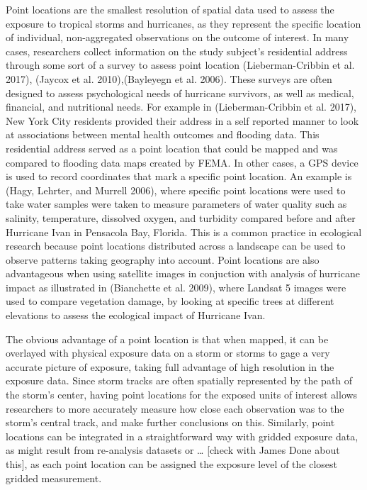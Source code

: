 \documentclass[]{article}
\begin{document}
Point locations are the smallest resolution of spatial data used to
assess the exposure to tropical storms and hurricanes, as they represent
the specific location of individual, non-aggregated observations on the
outcome of interest. In many cases, researchers collect information on
the study subject's residential address through some sort of a survey to
assess point location (Lieberman-Cribbin et al. 2017), (Jaycox et al.
2010),(Bayleyegn et al. 2006). These surveys are often designed to
assess psychological needs of hurricane survivors, as well as medical,
financial, and nutritional needs. For example in (Lieberman-Cribbin et
al. 2017), New York City residents provided their address in a self
reported manner to look at associations between mental health outcomes
and flooding data. This residential address served as a point location
that could be mapped and was compared to flooding data maps created by
FEMA. In other cases, a GPS device is used to record coordinates that
mark a specific point location. An example is (Hagy, Lehrter, and
Murrell 2006), where specific point locations were used to take water
samples were taken to measure parameters of water quality such as
salinity, temperature, dissolved oxygen, and turbidity compared before
and after Hurricane Ivan in Pensacola Bay, Florida. This is a common
practice in ecological research because point locations distributed
across a landscape can be used to observe patterns taking geography into
account. Point locations are also advantageous when using satellite
images in conjuction with analysis of hurricane impact as illustrated in
(Bianchette et al. 2009), where Landsat 5 images were used to compare
vegetation damage, by looking at specific trees at different elevations
to assess the ecological impact of Hurricane Ivan.

The obvious advantage of a point location is that when mapped, it can be
overlayed with physical exposure data on a storm or storms to gage a
very accurate picture of exposure, taking full advantage of high
resolution in the exposure data. Since storm tracks are often spatially
represented by the path of the storm's center, having point locations
for the exposed units of interest allows researchers to more accurately
measure how close each observation was to the storm's central track, and
make further conclusions on this. Similarly, point locations can be
integrated in a straightforward way with gridded exposure data, as might
result from re-analysis datasets or \ldots{} {[}check with James Done
about this{]}, as each point location can be assigned the exposure level
of the closest gridded measurement.
\end{document}
